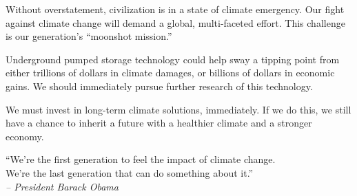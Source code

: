 \documentclass[hidelinks,12pt,a4paper]{article}
\begin{document}
Without overstatement, civilization is in a state of climate emergency. Our fight against climate change will demand a global, multi-faceted effort. This challenge is our generation's “moonshot mission.”

Underground pumped storage technology could help sway a tipping point from either trillions of dollars in climate damages, or billions of dollars in economic gains. We should immediately pursue further research of this technology.

We must invest in long-term climate solutions, immediately. If we do this, we still have a chance to inherit a future with a healthier climate and a stronger economy.

\begin{displayquote}
“We’re the first generation to feel the impact of climate change. \\  We’re the last generation that can do something about it.” \cite{ObamaIssuesChallengeOnClimateChangeWithPowerPlantRule} \\ \textit{-- President Barack Obama}
\end{displayquote}


\pagebreak[4]
{\footnotesize


}

\end{document}

